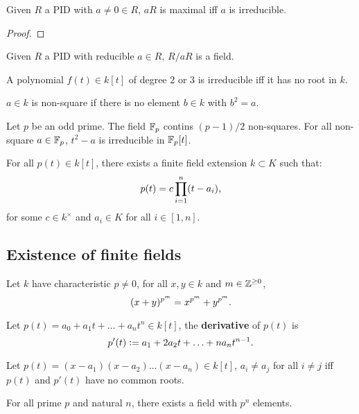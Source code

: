 \documentclass{report}
\begin{document}
\begin{lemma}
    Given $R$ a PID with $a\neq0\in R$, $aR$ is maximal iff $a$ is irreducible.
    \begin{proof}
        
    \end{proof}
\end{lemma}

\begin{corollary}
    Given $R$ a PID with reducible $a\in R$, $R/aR$ is a field.
\end{corollary}

\begin{theorem}
    A polynomial $f(t)\in k[t]$ of degree $2$ or $3$ is irreducible iff it has no root in $k$.
\end{theorem}

\begin{definition}
    $a\in k$ is non-square if there is no element $b\in k$ with $b^2=a$.
\end{definition}

\begin{lemma}
    Let $p$ be an odd prime. The field $\mathbb{F}_p$ contins $(p-1)/2$ non-squares. For all non-square $a\in\mathbb{F}_p$, $t^2-a$ is irreducible in $\mathbb{F}_p[t]$.
\end{lemma}

\begin{theorem}
    For all $p(t)\in k[t]$, there exists a finite field extension $k\subset K$ such that: \[
        p(t)=c\prod_{i=1}^n(t-a_i)
        \text{\textcolor{black}{,}}
    \] for some $c\in k^\times$ and $a_i\in K$ for all $i\in[1,n]$.
\end{theorem}

\subsection{Existence of finite fields}

\begin{theorem}
    Let $k$ have characteristic $p\neq 0$, for all $x,y\in k$ and $m\in\mathbb{Z}^{\geq 0}$, \[
        (x+y)^{p^m}=x^{p^m}+y^{p^m}
        \text{\textcolor{black}{.}}
    \]
\end{theorem}

\vspace{-30pt}

\begin{definition}[Derivative]
    Let $p(t)= a_0 + a_1t + \ldots + a_nt^n\in k[t]$, the \textbf{derivative} of $p(t)$ is \[
        p'(t):= a_1 + 2a_2t + \ldots + na_nt^{n-1}
        \text{\textcolor{black}{.}}
    \]
\end{definition}

\begin{lemma}
    Let $p(t)=(x-a_1)(x-a_2)\ldots(x-a_n)\in k[t]$, $a_i\neq a_j$ for all $i\neq j$ iff $p(t)$ and $p'(t)$ have no common roots.
\end{lemma}

\begin{theorem}
    For all prime $p$ and natural $n$, there exists a field with $p^n$ elements.
\end{theorem}
\end{document}

